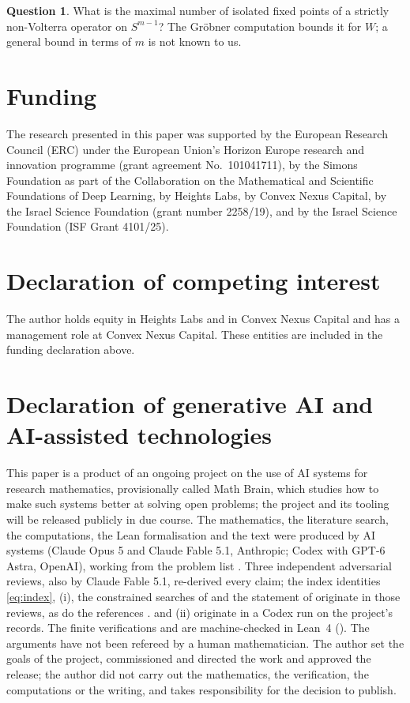 \documentclass[11pt]{amsart}
\theoremstyle{definition}
\newtheorem{question}[theorem]{Question}
\newcommand{\Simp}{S^{m-1}}
\begin{document}
\begin{question}
What is the maximal number of isolated fixed points of a strictly non-Volterra operator on $\Simp$? The Gr\"obner computation bounds it for $W$; a general bound in terms of $m$ is not known to us.
\end{question}

\section*{Funding}
The research presented in this paper was supported by the European Research Council (ERC) under the European Union's Horizon Europe research and innovation programme (grant agreement No.~101041711), by the Simons Foundation as part of the Collaboration on the Mathematical and Scientific Foundations of Deep Learning, by Heights Labs, by Convex Nexus Capital, by the Israel Science Foundation (grant number 2258/19), and by the Israel Science Foundation (ISF Grant 4101/25).

\section*{Declaration of competing interest}
The author holds equity in Heights Labs and in Convex Nexus Capital and has a management role at Convex Nexus Capital. These entities are included in the funding declaration above.

\section*{Declaration of generative AI and AI-assisted technologies}
This paper is a product of an ongoing project on the use of AI systems for research mathematics, provisionally called Math Brain, which studies how to make such systems better at solving open problems; the project and its tooling will be released publicly in due course. The mathematics, the literature search, the computations, the Lean formalisation and the text were produced by AI systems (Claude Opus 5 and Claude Fable 5.1, Anthropic; Codex with GPT-6 Astra, OpenAI), working from the problem list \cite{GR09}. Three independent adversarial reviews, also by Claude Fable 5.1, re-derived every claim; the index identities \eqref{eq:index}, (i), the constrained searches of  and the statement of  originate in those reviews, as do the references \cite{Jam16,Jam17}.  and (ii) originate in a Codex run on the project's records. The finite verifications and  are machine-checked in Lean~4 (). The arguments have not been refereed by a human mathematician. The author set the goals of the project, commissioned and directed the work and approved the release; the author did not carry out the mathematics, the verification, the computations or the writing, and takes responsibility for the decision to publish.
\end{document}
